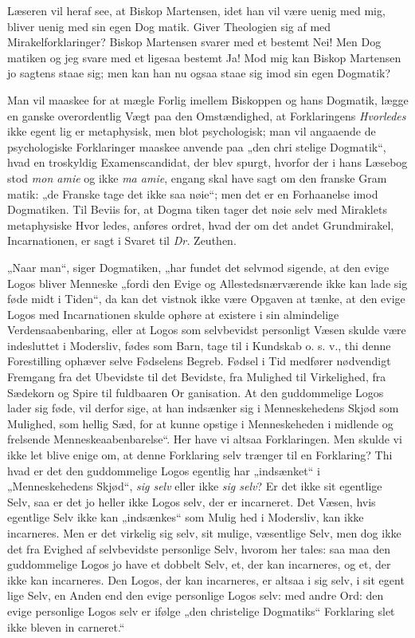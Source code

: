 \documentclass[12pt]{book}
\newcommand{\opage}[1]{\marginnote{\footnotesize\textit{[#1]}}}
\begin{document}
Læseren vil heraf see, at Biskop Martensen, idet han
vil være uenig med mig, bliver uenig med sin egen Dog\-%
matik. Giver Theologien sig af med Mirakelforklaringer?
Biskop Martensen svarer med et bestemt Nei! Men Dog\-%
matiken og jeg svare med et ligesaa bestemt Ja! Mod mig
kan Biskop Martensen jo sagtens staae sig; men kan han
nu ogsaa staae sig imod sin egen Dogmatik?

Man vil maaskee for at mægle Forlig imellem Biskoppen
og hans Dogmatik, lægge en ganske overordentlig Vægt paa
den Omstændighed, at Forklaringens \emph{Hvorledes} ikke egent\-%
lig er metaphysisk, men blot psychologisk; man vil angaaende
de psychologiske Forklaringer maaskee anvende paa „den chri\-%
stelige Dogmatik“, hvad en troskyldig Examenscandidat, der
blev spurgt, hvorfor der i hans Læsebog stod \textit{mon amie} og
ikke \textit{ma amie}, engang skal have sagt om den franske Gram\-%
matik: „de Franske tage det ikke saa nøie“; men det er en
Forhaanelse imod Dogmatiken. Til Beviis for, at Dogma\-%
tiken tager det nøie selv med Miraklets metaphysiske Hvor\-%
ledes, anføres ordret, hvad der om det andet Grundmirakel,
Incarnationen, er sagt i Svaret til \textit{Dr.} Zeuthen.

„Naar man“, siger Dogmatiken, „har fundet det selvmod\-%
sigende, at den evige Logos bliver Menneske „fordi den Evige og
Allestedsnærværende ikke kan lade sig føde midt i Tiden“, da kan
det vistnok ikke være Opgaven at tænke, at den evige Logos
med Incarnationen skulde ophøre at existere i sin almindelige
Verdensaabenbaring, eller at Logos som selvbevidst personligt
\opage{88}\setcounter{footnote}{0}%
Væsen skulde være indesluttet i Modersliv, fødes som Barn,
tage til i Kundskab o. s. v., thi denne Forestilling ophæver
selve Fødselens Begreb. Fødsel i Tid medfører nødvendigt
Fremgang fra det Ubevidste til det Bevidste, fra Mulighed
til Virkelighed, fra Sædekorn og Spire til fuldbaaren Or\-%
ganisation. At den guddommelige Logos lader sig føde, vil
derfor sige, at han indsænker sig i Menneskehedens Skjød
som Mulighed, som hellig Sæd, for at kunne opstige i
Menneskeheden i midlende og frelsende Menneskeaabenbarelse“.
Her have vi altsaa Forklaringen. Men skulde vi ikke let
blive enige om, at denne Forklaring selv trænger til en
Forklaring? Thi hvad er det den guddommelige Logos
egentlig har „indsænket“ i „Menneskehedens Skjød“, \emph{sig
selv} eller ikke \emph{sig selv}? Er det ikke sit egentlige Selv,
saa er det jo heller ikke Logos selv, der er incarneret. Det
Væsen, hvis egentlige Selv ikke kan „indsænkes“ som Mulig\-%
hed i Modersliv, kan ikke incarneres. Men er det virkelig
sig selv, sit mulige, væsentlige Selv, men dog ikke det fra
Evighed af selvbevidste personlige Selv, hvorom her tales:
saa maa den guddommelige Logos jo have et dobbelt Selv,
et, der kan incarneres, og et, der ikke kan incarneres. Den
Logos, der kan incarneres, er altsaa i sig selv, i sit egent\-%
lige Selv, en Anden end den evige personlige Logos selv:
med andre Ord: den evige personlige Logos selv er ifølge
„den christelige Dogmatiks“ Forklaring slet ikke bleven in\-%
carneret.“%
\end{document}

